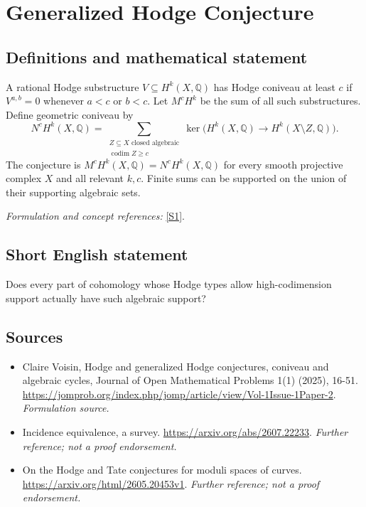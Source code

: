 \documentclass[11pt]{article}
\begin{document}
\section*{\texorpdfstring{Generalized Hodge Conjecture}{Generalized Hodge Conjecture}}\label{30000968}
\subsection{Definitions and mathematical statement}
A rational Hodge substructure $V\subseteq H^k(X,{\mathbb{Q}})$ has Hodge coniveau at least $c$ if $V^{a,b}=0$ whenever $a<c$ or $b<c$. Let $M^cH^k$ be the sum of all such substructures. Define geometric coniveau by
\[
 N^cH^k(X,{\mathbb{Q}})=\sum_{\substack{Z\subseteq X\text{ closed algebraic}\\ \operatorname{codim}Z\ge c}}
 \ker\bigl(H^k(X,{\mathbb{Q}})\to H^k(X\setminus Z,{\mathbb{Q}})\bigr).
\]
The conjecture is $M^cH^k(X,{\mathbb{Q}})=N^cH^k(X,{\mathbb{Q}})$ for every smooth projective complex $X$ and all relevant $k,c$. Finite sums can be supported on the union of their supporting algebraic sets.
\par\smallskip\textit{Formulation and concept references:} \href{https://jomprob.org/index.php/jomp/article/view/Vol-1Issue-1Paper-2}{[S1]}.

\subsection{Short English statement}
Does every part of cohomology whose Hodge types allow high-codimension support actually have such algebraic support?
\subsection{Sources}
\begin{itemize}
\item[S1]Claire Voisin, Hodge and generalized Hodge conjectures, coniveau and algebraic cycles, Journal of Open Mathematical Problems 1(1) (2025), 16-51.
\url{https://jomprob.org/index.php/jomp/article/view/Vol-1Issue-1Paper-2}.
\textit{Formulation source.}
\item[S2]Incidence equivalence, a survey.
\url{https://arxiv.org/abs/2607.22233}.
\textit{Further reference; not a proof endorsement.}
\item[S3]On the Hodge and Tate conjectures for moduli spaces of curves.
\url{https://arxiv.org/html/2605.20453v1}.
\textit{Further reference; not a proof endorsement.}
\end{itemize}
\end{document}
